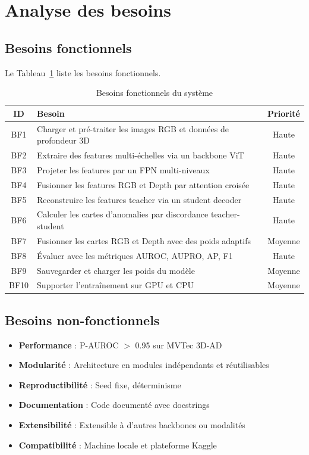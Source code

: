 \documentclass[12pt,a4paper,oneside]{report}
\begin{document}
\section{Analyse des besoins}

\subsection{Besoins fonctionnels}

Le Tableau~\ref{tab:besoins_fonc} liste les besoins fonctionnels.

\begin{table}[H]
\centering
\caption{Besoins fonctionnels du système}
\label{tab:besoins_fonc}
\small
\begin{tabularx}{\textwidth}{c X c}
\toprule
\textbf{ID} & \textbf{Besoin} & \textbf{Priorité} \\
\midrule
\rowcolor{tableheader} BF1 & Charger et pré-traiter les images RGB et données de profondeur 3D & Haute \\
BF2 & Extraire des features multi-échelles via un backbone ViT & Haute \\
\rowcolor{tableheader} BF3 & Projeter les features par un FPN multi-niveaux & Haute \\
BF4 & Fusionner les features RGB et Depth par attention croisée & Haute \\
\rowcolor{tableheader} BF5 & Reconstruire les features teacher via un student decoder & Haute \\
BF6 & Calculer les cartes d'anomalies par discordance teacher-student & Haute \\
\rowcolor{tableheader} BF7 & Fusionner les cartes RGB et Depth avec des poids adaptifs & Moyenne \\
BF8 & Évaluer avec les métriques AUROC, AUPRO, AP, F1 & Haute \\
\rowcolor{tableheader} BF9 & Sauvegarder et charger les poids du modèle & Moyenne \\
BF10 & Supporter l'entraînement sur GPU et CPU & Moyenne \\
\bottomrule
\end{tabularx}
\end{table}

\subsection{Besoins non-fonctionnels}

\begin{itemize}
    \item \textbf{Performance} : P-AUROC $>$ 0.95 sur MVTec 3D-AD
    \item \textbf{Modularité} : Architecture en modules indépendants et réutilisables
    \item \textbf{Reproductibilité} : Seed fixe, déterminisme
    \item \textbf{Documentation} : Code documenté avec docstrings
    \item \textbf{Extensibilité} : Extensible à d'autres backbones ou modalités
    \item \textbf{Compatibilité} : Machine locale et plateforme Kaggle
\end{itemize}
\end{document}
